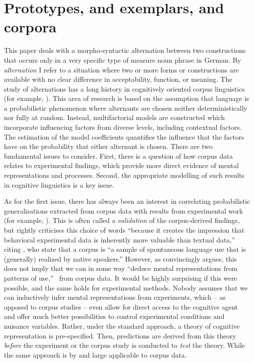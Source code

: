 \section{Prototypes, and exemplars, and corpora}
\label{sec:cogocl}

This paper deals with a morpho-syntactic alternation between two constructions that occurs only in a very specific type of measure noun phrase in German.
By \textit{alternation} I refer to a situation where two or more forms or constructions are available with no clear difference in acceptability, function, or meaning.
The study of alternations has a long history in cognitively oriented corpus linguistics (for example, \citealp{BresnanEa2007,BresnanHay2010,BresnanFord2010,DivjakArppe2013,Gries2015,NessetJanda2010}).
This area of research is based on the assumption that language is a probabilistic phenomenon \citep{Bresnan2007} where alternants are chosen neither deterministically nor fully at random.
Instead, multifactorial models are constructed which incorporate influencing factors from diverse levels, including contextual factors.
The estimation of the model coefficients quantifies the influence that the factors have on the probability that either alternant is chosen.
There are two fundamental issues to consider.
First, there is a question of how corpus data relates to experimental findings, which provide more direct evidence of mental representations and processes.
Second, the appropriate modelling of such results in cognitive linguistics is a key issue.

As for the first issue, there has always been an interest in correlating probabilistic generalisations extracted from corpus data with results from experimental work (for example, \citealp{ArppeJaervikivi2007,BresnanEa2007,BresnanFord2010,DivjakGries2008,DivjakEa2016,FordBresnan2013}).
This is often called a \textit{validation} of the corpus-derived findings, but \citet[303]{Divjak2016a} rightly criticises this choice of words ``because it creates the impression that behavioral experimental data is inherently more valuable than textual data,'' citing \cite{TummersEa2005}, who state that a corpus is ``a sample of spontaneous language use that is (generally) realized by native speakers.''
However, as \citet[486--487]{Dabrowska2016} convincingly argues, this does not imply that we can in some way ``deduce mental representations from patterns of use,'' \ie\ from corpus data.
It would be highly surprising if this were possible, and the same holds for experimental methods.
Nobody assumes that we can inductively infer mental representations from experiments, which -- as opposed to corpus studies -- even allow for direct access to the cognitive agent and offer much better possibilities to control experimental conditions and nuisance variables.
Rather, under the standard approach, a theory of cognitive representation is pre-specified.
Then, predictions are derived from this theory \textit{before} the experiment or the corpus study is conducted to \textit{test} the theory.
While the same approach is by and large applicable to corpus data.


